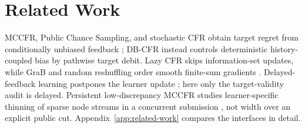 \section{Related Work}
\label{sec:related}

MCCFR, Public Chance Sampling, and stochastic CFR obtain target regret from
conditionally unbiased feedback
\citep{lanctot2009mccfr,johanson2012pcs,farina2020stochastic}; DB-CFR instead
controls deterministic history-coupled bias by pathwise target debit.  Lazy CFR
skips information-set updates, while GraB and random reshuffling order smooth
finite-sum gradients \citep{zhou2020lazy,lu2022grab,das2022withoutreplacement}.
Delayed-feedback learning postpones the learner update
\citep{joulani2013delay}; here only the target-validity audit is delayed.
Persistent low-discrepancy MCCFR studies learner-specific thinning of sparse
node streams in a concurrent submission \citep{anonymous2027amccfr}, not width
over an explicit public cut.  Appendix~\ref{app:related-work} compares the
interfaces in detail.

